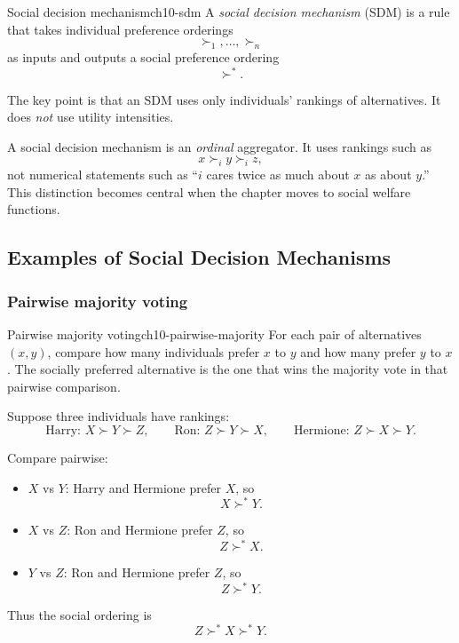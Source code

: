 \begin{definition}{Social decision mechanism}{ch10-sdm}
A \emph{social decision mechanism} (SDM) is a rule that takes individual preference orderings
\[
\succ_1,\dots,\succ_n
\]
as inputs and outputs a social preference ordering
\[
\succ^*.
\]
\end{definition}

The key point is that an SDM uses only individuals' rankings of alternatives. It does \emph{not} use utility intensities.

\begin{examtip}
A social decision mechanism is an \emph{ordinal} aggregator. It uses rankings such as
\[
x \succ_i y \succ_i z,
\]
not numerical statements such as ``$i$ cares twice as much about $x$ as about $y$.'' This distinction becomes central when the chapter moves to social welfare functions.
\end{examtip}

\subsection{Examples of Social Decision Mechanisms}

\subsubsection{Pairwise majority voting}

\begin{definition}{Pairwise majority voting}{ch10-pairwise-majority}
For each pair of alternatives $(x,y)$, compare how many individuals prefer $x$ to $y$ and how many prefer $y$ to $x$. The socially preferred alternative is the one that wins the majority vote in that pairwise comparison.
\end{definition}

\begin{examplebox}[title={Worked Example: Pairwise majority voting}]
Suppose three individuals have rankings:
\[
\text{Harry: } X \succ Y \succ Z,
\qquad
\text{Ron: } Z \succ Y \succ X,
\qquad
\text{Hermione: } Z \succ X \succ Y.
\]

Compare pairwise:
\begin{itemize}
    \item $X$ vs $Y$: Harry and Hermione prefer $X$, so
    \[
    X \succ^* Y.
    \]
    \item $X$ vs $Z$: Ron and Hermione prefer $Z$, so
    \[
    Z \succ^* X.
    \]
    \item $Y$ vs $Z$: Ron and Hermione prefer $Z$, so
    \[
    Z \succ^* Y.
    \]
\end{itemize}

Thus the social ordering is
\[
\boxed{Z \succ^* X \succ^* Y.}
\]
\end{examplebox}

